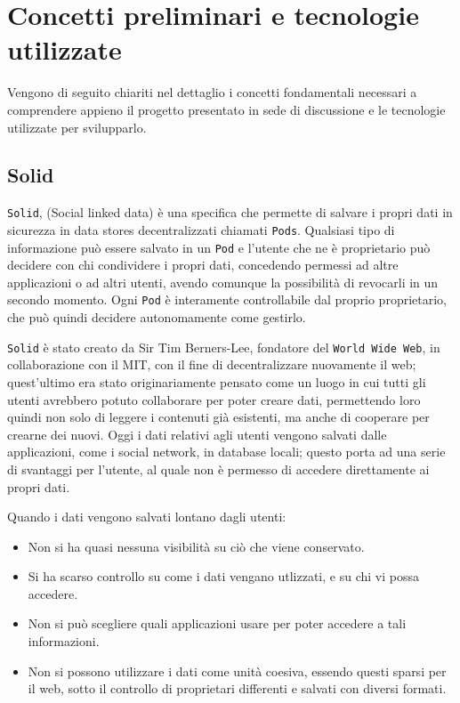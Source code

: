 \chapter{Concetti preliminari e tecnologie utilizzate}

\medskip

Vengono di seguito chiariti nel dettaglio i concetti fondamentali necessari a comprendere appieno il progetto presentato in sede di discussione e le tecnologie utilizzate per svilupparlo.

\section{Solid}

\medskip

{\tt Solid}, (Social linked data) è una specifica che permette di salvare i propri dati in sicurezza in data stores decentralizzati chiamati {\tt Pods}. Qualsiasi tipo di informazione può essere salvato in un {\tt  Pod} e l'utente che ne è proprietario può decidere con chi condividere i propri dati, concedendo permessi ad altre applicazioni o ad altri utenti, avendo comunque la possibilità di revocarli in un secondo momento. Ogni {\tt Pod} è interamente controllabile dal proprio proprietario, che può quindi decidere autonomamente come gestirlo. 

\medskip

{\tt Solid} è stato creato da Sir Tim Berners-Lee, fondatore del {\tt World Wide Web}, in collaborazione con il MIT, con il fine di decentralizzare nuovamente il web; quest'ultimo era stato originariamente pensato come un luogo in cui tutti gli utenti avrebbero potuto collaborare per poter creare dati, permettendo loro quindi non solo di leggere i contenuti già esistenti, ma anche di cooperare per crearne dei nuovi. Oggi i dati relativi agli utenti vengono salvati dalle applicazioni, come i social network, in database locali; questo porta ad una serie di svantaggi per l'utente, al quale non è permesso di accedere direttamente ai propri dati.

\bigskip

Quando i dati vengono salvati lontano dagli utenti:

\begin{itemize}
	\item Non si ha quasi nessuna visibilità su ciò che viene conservato.
	\item Si ha scarso controllo su come i dati vengano utlizzati, e su chi vi possa accedere.
	\item Non si può scegliere quali applicazioni usare per poter accedere a tali informazioni.
	\item Non si possono utilizzare i dati come unità coesiva, essendo questi sparsi per il web, sotto il controllo di proprietari differenti e salvati con diversi formati.
\end{itemize}

